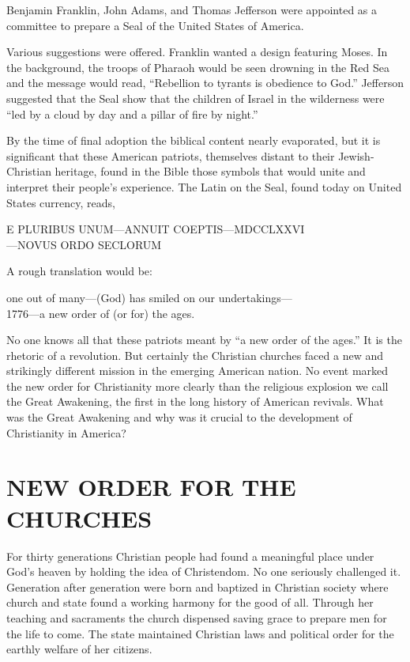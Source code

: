 
 Benjamin Franklin, John Adams, and Thomas Jefferson were appointed as a
committee to prepare a Seal of the United States of America.

Various suggestions were offered. Franklin wanted a design featuring Moses. In the background, the
troops of Pharaoh would be seen drowning in the Red Sea and the message would read, “Rebellion to
tyrants is obedience to God.” Jefferson suggested that the Seal show that the children of Israel in
the wilderness were “led by a cloud by day and a pillar of fire by night.”

By the time of final adoption the biblical content nearly evaporated, but it is significant that
these American patriots, themselves distant to their Jewish-Christian heritage, found in the Bible
those symbols that would unite and interpret their people’s experience. The Latin on the Seal, found
today on United States currency, reads,

\begin{centerlines}
E PLURIBUS UNUM—ANNUIT COEPTIS—MDCCLXXVI\\
—NOVUS ORDO SECLORUM
\end{centerlines}

A rough translation would be:

\begin{centerlines}
one out of many—(God) has smiled on our undertakings—\\
1776—a new order of (or for) the ages.
\end{centerlines}

No one knows all that these patriots meant by “a new order of the ages.” It is the rhetoric of a
revolution. But certainly the Christian churches faced a new and strikingly different mission in the
emerging American nation. No event marked the new order for Christianity more clearly than the
religious explosion we call the Great Awakening, the first in the long history of American revivals.
What was the Great Awakening and why was it crucial to the development of Christianity in America?

\section{NEW ORDER FOR THE CHURCHES}

For thirty generations Christian people had found a meaningful place under God’s heaven by holding
the idea of Christendom. No one seriously challenged it. Generation after generation were born and
baptized in Christian society where church and state found a working harmony for the good of all.
Through her teaching and sacraments the church dispensed saving grace to prepare men for the life to
come. The state maintained Christian laws and political order for the earthly welfare of her
citizens.

